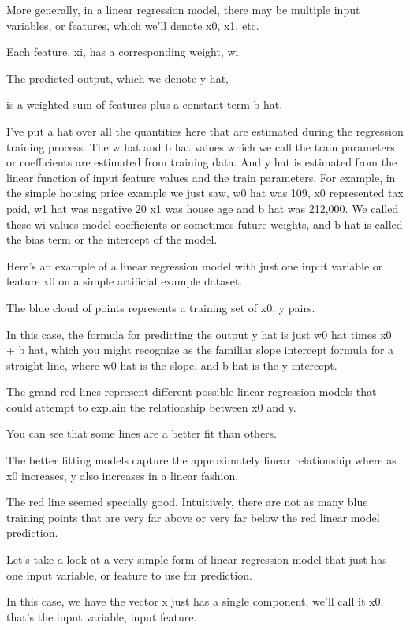 \begin{multicols}{2}
More generally, in a linear regression model, there may be multiple input variables, or features, which we'll denote x0, x1, etc. 

Each feature, xi, has a corresponding weight, wi. 

The predicted output, which we denote y hat, 

is a weighted sum of features plus a constant term b hat. 

I've put a hat over all the quantities here that are estimated during the regression training process. The w hat and b hat values which we call the train parameters or coefficients are estimated from training data. And y hat is estimated from the linear function of input feature values and the train parameters. For example, in the simple housing price example we just saw, w0 hat was 109, x0 represented tax paid, w1 hat was negative 20 x1 was house age and b hat was 212,000. We called these wi values model coefficients or sometimes future weights, and b hat is called the bias term or the intercept of the model. 

Here's an example of a linear regression model with just one input variable or feature x0 on a simple artificial example dataset. 

The blue cloud of points represents a training set of x0, y pairs. 

In this case, the formula for predicting the output y hat is just w0 hat times x0 + b hat, which you might recognize as the familiar slope intercept formula for a straight line, where w0 hat is the slope, and b hat is the y intercept. 

The grand red lines represent different possible linear regression models that could attempt to explain the relationship between x0 and y. 

You can see that some lines are a better fit than others. 

The better fitting models capture the approximately linear relationship where as x0 increases, y also increases in a linear fashion. 

The red line seemed specially good. Intuitively, there are not as many blue training points that are very far above or very far below the red linear model prediction. 

Let's take a look at a very simple form of linear regression model that just has one input variable, or feature to use for prediction. 

In this case, we have the vector x just has a single component, we'll call it x0, that's the input variable, input feature. 


\end{multicols}
